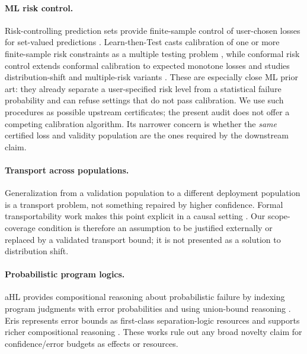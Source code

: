 \documentclass[10pt]{article}
\begin{document}
\paragraph{ML risk control.}
Risk-controlling prediction sets provide finite-sample control of user-chosen
losses for set-valued predictions \citep{BatesEtAl2021RCPS}.  Learn-then-Test
casts calibration of one or more finite-sample risk constraints as a multiple
testing problem \citep{AngelopoulosEtAl2025LTT}, while conformal risk control
extends conformal calibration to expected monotone losses and studies
distribution-shift and multiple-risk variants
\citep{AngelopoulosEtAl2024CRC}.  These are especially close ML prior art:
they already separate a user-specified risk level from a statistical failure
probability and can refuse settings that do not pass calibration.  We use such
procedures as possible upstream certificates; the present audit does not offer
a competing calibration algorithm.  Its narrower concern is whether the
\emph{same} certified loss and validity population are the ones required by
the downstream claim.

\paragraph{Transport across populations.}
Generalization from a validation population to a different deployment
population is a transport problem, not something repaired by higher
confidence.  Formal transportability work makes this point explicit in a
causal setting \citep{PearlBareinboim2014}.  Our scope-coverage condition is
therefore an assumption to be justified externally or replaced by a validated
transport bound; it is not presented as a solution to distribution shift.

\paragraph{Probabilistic program logics.}
aHL provides compositional reasoning about probabilistic failure by indexing
program judgments with error probabilities and using union-bound reasoning
\citep{BartheEtAl2016}.  Eris represents error bounds as first-class
separation-logic resources and supports richer compositional reasoning
\citep{AguirreEtAl2024}.  These works rule out any broad novelty claim for
confidence/error budgets as effects or resources.
\end{document}
